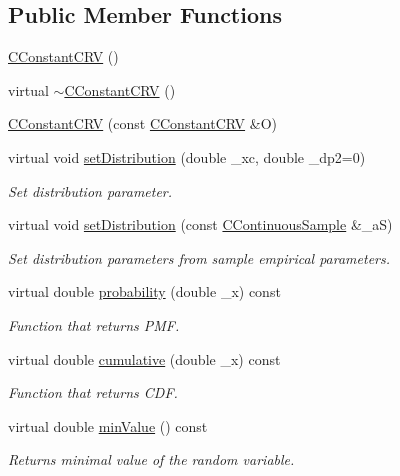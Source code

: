 \subsection*{Public Member Functions}
\begin{DoxyCompactItemize}
\item 
\hyperlink{class_c_constant_c_r_v_a83c7a44fb68bf048527412009a612f61}{C\-Constant\-C\-R\-V} ()
\item 
virtual \hyperlink{class_c_constant_c_r_v_ab25575c114e0fe2165d8cb7ec12a65bb}{$\sim$\-C\-Constant\-C\-R\-V} ()
\item 
\hyperlink{class_c_constant_c_r_v_a3bf02e24577267e0bd1984358785d79c}{C\-Constant\-C\-R\-V} (const \hyperlink{class_c_constant_c_r_v}{C\-Constant\-C\-R\-V} \&O)
\item 
virtual void \hyperlink{class_c_constant_c_r_v_ac85e4654e4760830a461b128d1af0293}{set\-Distribution} (double \-\_\-xc, double \-\_\-dp2=0)
\begin{DoxyCompactList}\small\item\em Set distribution parameter. \end{DoxyCompactList}\item 
virtual void \hyperlink{class_c_constant_c_r_v_a96e78eee64773501b8c44001942a3d7d}{set\-Distribution} (const \hyperlink{class_c_continuous_sample}{C\-Continuous\-Sample} \&\-\_\-a\-S)
\begin{DoxyCompactList}\small\item\em Set distribution parameters from sample empirical parameters. \end{DoxyCompactList}\item 
virtual double \hyperlink{class_c_constant_c_r_v_a3b32fa2e4cad96f6e777126f4b970b10}{probability} (double \-\_\-x) const 
\begin{DoxyCompactList}\small\item\em Function that returns P\-M\-F. \end{DoxyCompactList}\item 
virtual double \hyperlink{class_c_constant_c_r_v_ad4cc2382b81238efe0f62eb97ce2f360}{cumulative} (double \-\_\-x) const 
\begin{DoxyCompactList}\small\item\em Function that returns C\-D\-F. \end{DoxyCompactList}\item 
virtual double \hyperlink{class_c_constant_c_r_v_ab6c57777abbff6cb66d95b96d3f089b8}{min\-Value} () const 
\begin{DoxyCompactList}\small\item\em Returns minimal value of the random variable. \end{DoxyCompactList}\item 

\end{DoxyCompactItemize}
